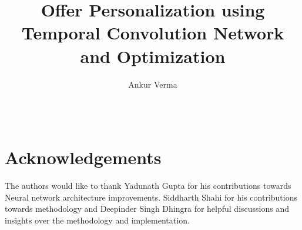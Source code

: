 \documentclass{article} %
\title{Offer Personalization using Temporal Convolution Network and Optimization}
\author{Ankur Verma \\
\text{Samya.ai} \\
\text{ankur.verma@samya.ai} \\
}
\begin{document}
\maketitle







\section{Acknowledgements}
The authors would like to thank Yadunath Gupta for his contributions towards Neural network architecture improvements. 
Siddharth Shahi for his contributions towards methodology and Deepinder Singh Dhingra for helpful discussions and 
insights over the methodology and implementation.



\clearpage
\appendix

\end{document}
